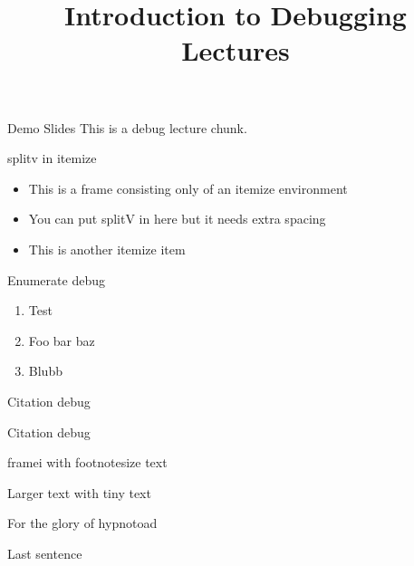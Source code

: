 \documentclass[11pt,compress,t,notes=noshow, xcolor=table]{beamer}
\title{Introduction to Debugging Lectures}
\begin{document}

\begin{frame}{Demo Slides}
  \vfill
  This is a debug lecture chunk.
  \vfill
\end{frame}


\begin{frame}{splitv in itemize}
  \begin{itemize}
    \item This is a frame consisting only of an itemize environment
    \item You can put splitV in here but it needs extra spacing
    \vfill
    \vfill
    \item This is another itemize item
  \end{itemize}
\end{frame}

\begin{frame}{Enumerate debug}
  \begin{enumerate}
    \item Test
    \item Foo bar baz
    \item Blubb
  \end{enumerate}
\end{frame}


\begin{frame}{Citation debug}
  \vfill
\end{frame}

\begin{frame}{Citation debug}
\end{frame}



\begin{framei}[fs=footnotesize,sep=M]{framei with footnotesize text}
  \item Larger text with tiny text
  \item For the glory of hypnotoad

  \vfill

  \item Last sentence

\end{framei}
\end{document}
